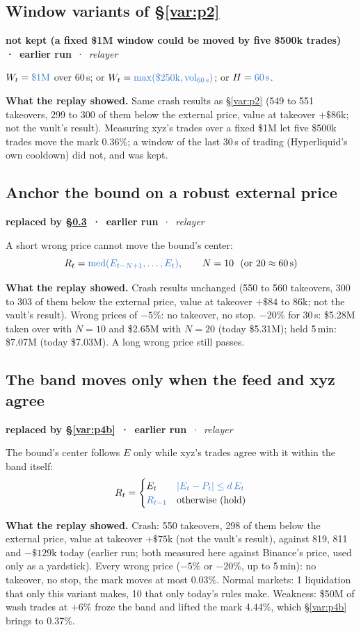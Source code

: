 \documentclass[10.5pt,a4paper]{article}
\newcommand{\chg}[1]{\ensuremath{{\color[HTML]{2F74D0}#1}}}
\newcommand{\med}{\operatorname{med}}
\newcommand{\st}[3]{\textcolor{#1}{\textbf{#2}} \,·\, \emph{#3}\par}
\newcommand{\res}[1]{\par\textbf{What the replay showed.} #1\par}
\begin{document}
\subsection{Window variants of \S\ref{var:p2}}\label{var:auto6}
\st{sup}{not kept (a fixed \$1M window could be moved by five \$500k trades) \,·\, earlier run}{relayer}
$W_t = \chg{\$1\text{M}}$ over 60\,s; or $W_t = \chg{\max(\$250\text{k}, \text{vol}_{60\,\text{s}})}$; or $H = \chg{60\,\text{s}}$.
\res{Same crash results as \S\ref{var:p2} (549 to 551 takeovers, 299 to 300 of them below the external price, value at takeover $+\$86$k; not the vault's result). Measuring xyz's trades over a fixed \$1M let five \$500k trades move the mark 0.36\%; a window of the last 30\,s of trading (Hyperliquid's own cooldown) did not, and was kept.}

\subsection{Anchor the bound on a robust external price}\label{var:p3}
\st{sup}{replaced by \S\ref{var:p4} \,·\, earlier run}{relayer}
A short wrong price cannot move the bound's center:
\begin{equation}
R_t = \chg{\med(E_{t-N+1},\dots,E_t)},\qquad N = 10\ \ (\text{or } 20 \approx 60\,\text{s})
\end{equation}
\res{Crash results unchanged (550 to 560 takeovers, 300 to 303 of them below the external price, value at takeover $+\$84$ to 86k; not the vault's result). Wrong prices of $-5\%$: no takeover, no stop. $-20\%$ for 30\,s: \$5.28M taken over with $N=10$ and \$2.65M with $N=20$ (today \$5.31M); held 5\,min: \$7.07M (today \$7.03M). A long wrong price still passes.}

\subsection{The band moves only when the feed and xyz agree}\label{var:p4}
\st{sup}{replaced by \S\ref{var:p4b} \,·\, earlier run}{relayer}
The bound's center follows $E$ only while xyz's trades agree with it within the band itself:
\begin{equation}
R_t = \begin{cases} E_t & \chg{|E_t - P_t| \le d\,E_t}\\ \chg{R_{t-1}} & \text{otherwise (hold)}\end{cases}
\end{equation}
\res{Crash: 550 takeovers, 298 of them below the external price, value at takeover $+\$75$k (not the vault's result), against 819, 811 and $-\$129$k today (earlier run; both measured here against Binance's price, used only as a yardstick). Every wrong price ($-5\%$ or $-20\%$, up to 5\,min): no takeover, no stop, the mark moves at most 0.03\%. Normal markets: 1 liquidation that only this variant makes, 10 that only today's rules make. Weakness: \$50M of wash trades at $+6\%$ froze the band and lifted the mark 4.44\%, which \S\ref{var:p4b} brings to 0.37\%.}
\end{document}
